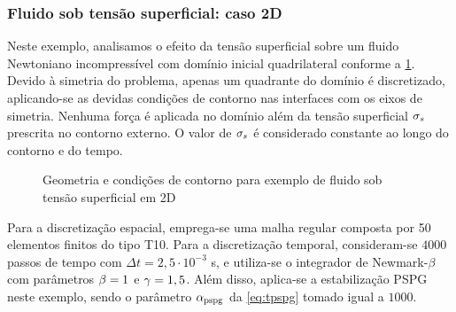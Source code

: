 \documentclass[Tese.tex]{subfiles}
\begin{document}
\subsubsection{Fluido sob tensão superficial: caso 2D}

Neste exemplo, analisamos o efeito da tensão superficial sobre um fluido Newtoniano incompressível com domínio inicial quadrilateral conforme a \cref{fig:SurfaceTension2D}. Devido à simetria do problema, apenas um quadrante do domínio é discretizado, aplicando-se as devidas condições de contorno nas interfaces com os eixos de simetria. Nenhuma força é aplicada no domínio além da tensão superficial $\sigma_s$ prescrita no contorno externo. O valor de $\sigma_s$ é considerado constante ao longo do contorno e do tempo. 

\begin{figure}[!htb]
	\centering
	\caption{Geometria e condições de contorno para exemplo de fluido sob tensão superficial em 2D}
	\label{fig:SurfaceTension2D}
	{\small
		\noindent{}
	}	
\end{figure}

Para a discretização espacial, emprega-se uma malha regular composta por 50 elementos finitos do tipo T10. Para a discretização temporal, consideram-se $4000$ passos de tempo com $\Delta t = 2,5\cdot 10^{-3}$ s, e utiliza-se o integrador de Newmark-$\beta$ com parâmetros $\beta = 1$ e $\gamma = 1,5$. Além disso, aplica-se a estabilização PSPG neste exemplo, sendo o parâmetro $\alpha_\text{pspg}$ da \cref{eq:tpspg} tomado igual a $1000$.
\end{document}
